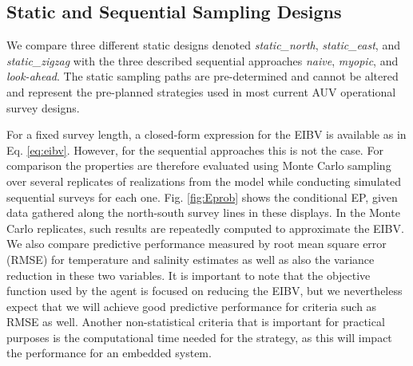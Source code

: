 \documentclass[aoas]{imsart}
\begin{document}
\subsection{Static and Sequential Sampling Designs}\label{sec:sampling_designs}


We compare three different static designs denoted
\textit{static\_north}, \textit{static\_east}, and
\textit{static\_zigzag} with the three described sequential approaches
\textit{naive}, \textit{myopic}, and \textit{look-ahead}. The static sampling paths are pre-determined and cannot be altered and represent the pre-planned strategies used in most current AUV
operational survey designs.

For a fixed survey length, a closed-form expression for the EIBV is available as in Eq. \eqref{eq:eibv}. However, for the sequential approaches this is not the
case. For comparison the properties are therefore evaluated using
Monte Carlo sampling over several replicates of realizations from the model while conducting simulated sequential surveys for each
one. Fig. \ref{fig:Eprob} shows the conditional EP, given data
gathered along the north-south survey lines in these displays. In the
Monte Carlo replicates, such results are repeatedly computed to
approximate the EIBV. We also compare predictive performance
measured by root mean square error (RMSE) for temperature and salinity
estimates as well as also the variance reduction in these two variables. It is
important to note that the objective function used by the agent is
focused on reducing the EIBV, but we nevertheless expect that
we will achieve good predictive performance for criteria such as RMSE
as well. Another non-statistical criteria that is important for
practical purposes is the computational time needed for the strategy,
as this will impact the performance for an embedded system.

\end{document}
